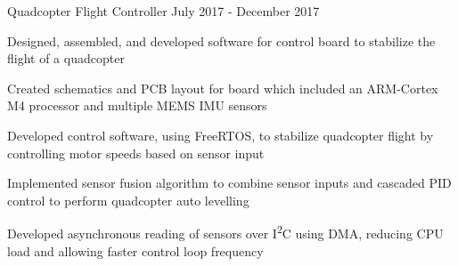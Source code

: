 \begin{cventries}

  \cventry
    {Quadcopter Flight Controller} %
    {} %
    {} %
    {July 2017 - December 2017} %
    {
      \begin{cvitems} %
        \item {Designed, assembled, and developed software for control board to stabilize the flight of a quadcopter}
        \item {Created schematics and PCB layout for board which included an ARM-Cortex M4 processor and multiple MEMS IMU sensors}
        \item {Developed control software, using FreeRTOS, to stabilize quadcopter flight by controlling motor speeds based on sensor input}
        \item {Implemented sensor fusion algorithm to combine sensor inputs and cascaded PID control to perform quadcopter auto levelling}
        \item {Developed asynchronous reading of sensors over I\textsuperscript{2}C using DMA, reducing CPU load and allowing faster control loop frequency}
      \end{cvitems}
    }


\end{cventries}
